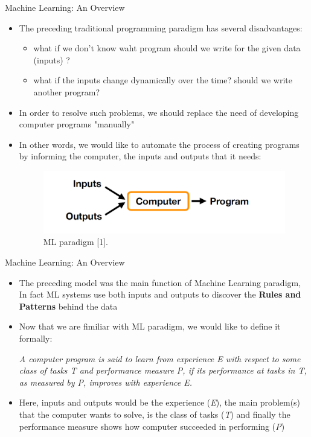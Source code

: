 \documentclass[compress,oilve]{beamer}
\begin{document}
\begin{frame}{Machine Learning: An Overview}
\begin{itemize}
\item The preceding traditional programming paradigm has several disadvantages:
	\begin{itemize}
	\item what if we don't know waht program should we write for the given data (inputs) ?
	\item what if the inputs change dynamically over the time? should we write another program? 
	\end{itemize}
\item In order to resolve such problems, we should replace the need of developing computer programs "manually"
\item In other words, we would like to automate the process of creating programs by informing the computer, the inputs and outputs that it needs:
\begin{center}
\begin{figure}
\includegraphics[scale=0.5]{2}
\center \caption{ML paradigm [1].}
\end{figure}
\end{center}
\end{itemize}
\end{frame}

\begin{frame}{Machine Learning: An Overview}
\begin{itemize}
\item The preceding model was the main function of Machine Learning paradigm, In fact ML systems use both inputs and outputs to discover the \textbf{Rules and Patterns} behind the data 
\item Now that we are fimiliar with ML paradigm, we would like to define it formally:
\begin{center}\textit{A computer program is said to learn from experience E with respect to some
class of tasks T and performance measure P, if its performance at tasks in T, as
measured by P, improves with experience E.}
\end{center}
\item Here, inputs and outputs would be the experience (\textit{E}), the main problem(s) that the computer wants to solve, is the class of tasks (\textit{T}) and finally the performance measure shows how computer succeeded in performing (\textit{P})
\end{itemize}
\end{frame}
\end{document}
